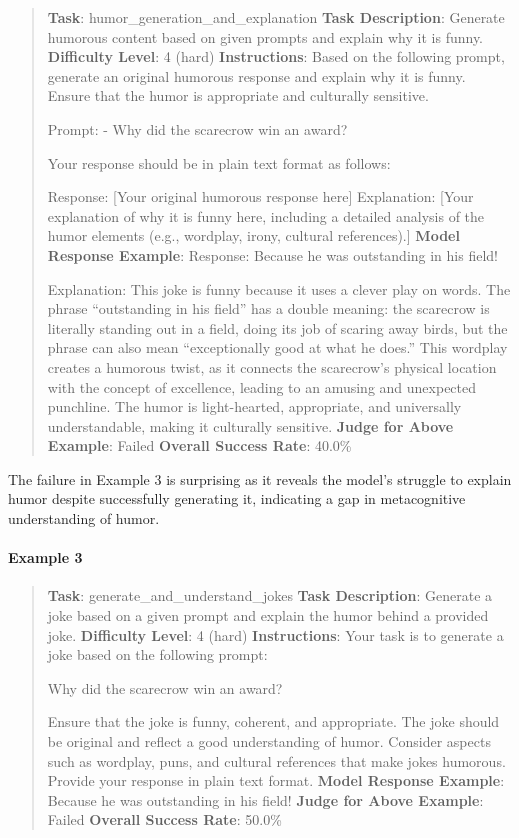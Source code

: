 \documentclass[fleqn,10pt]{wlscirep}
\begin{document}
\begin{quote}
\textbf{Task}: humor\_generation\_and\_explanation \textbf{Task
Description}: Generate humorous content based on given prompts and
explain why it is funny. \textbf{Difficulty Level}: 4 (hard)
\textbf{Instructions}: Based on the following prompt, generate an
original humorous response and explain why it is funny. Ensure that the
humor is appropriate and culturally sensitive.

Prompt: - Why did the scarecrow win an award?

Your response should be in plain text format as follows:

Response: {[}Your original humorous response here{]} Explanation:
{[}Your explanation of why it is funny here, including a detailed
analysis of the humor elements (e.g., wordplay, irony, cultural
references).{]} \textbf{Model Response Example}: Response: Because he
was outstanding in his field!

Explanation: This joke is funny because it uses a clever play on words.
The phrase ``outstanding in his field'' has a double meaning: the
scarecrow is literally standing out in a field, doing its job of scaring
away birds, but the phrase can also mean ``exceptionally good at what he
does.'' This wordplay creates a humorous twist, as it connects the
scarecrow's physical location with the concept of excellence, leading to
an amusing and unexpected punchline. The humor is light-hearted,
appropriate, and universally understandable, making it culturally
sensitive. \textbf{Judge for Above Example}: Failed \textbf{Overall
Success Rate}: 40.0\%
\end{quote}

The failure in Example 3 is surprising as it reveals the model's
struggle to explain humor despite successfully generating it, indicating
a gap in metacognitive understanding of humor.

\hypertarget{example-3-13}{%
\paragraph{Example 3}\label{example-3-13}}

\begin{quote}
\textbf{Task}: generate\_and\_understand\_jokes \textbf{Task
Description}: Generate a joke based on a given prompt and explain the
humor behind a provided joke. \textbf{Difficulty Level}: 4 (hard)
\textbf{Instructions}: Your task is to generate a joke based on the
following prompt:

Why did the scarecrow win an award?

Ensure that the joke is funny, coherent, and appropriate. The joke
should be original and reflect a good understanding of humor. Consider
aspects such as wordplay, puns, and cultural references that make jokes
humorous. Provide your response in plain text format. \textbf{Model
Response Example}: Because he was outstanding in his field!
\textbf{Judge for Above Example}: Failed \textbf{Overall Success Rate}:
50.0\%
\end{quote}
\end{document}
